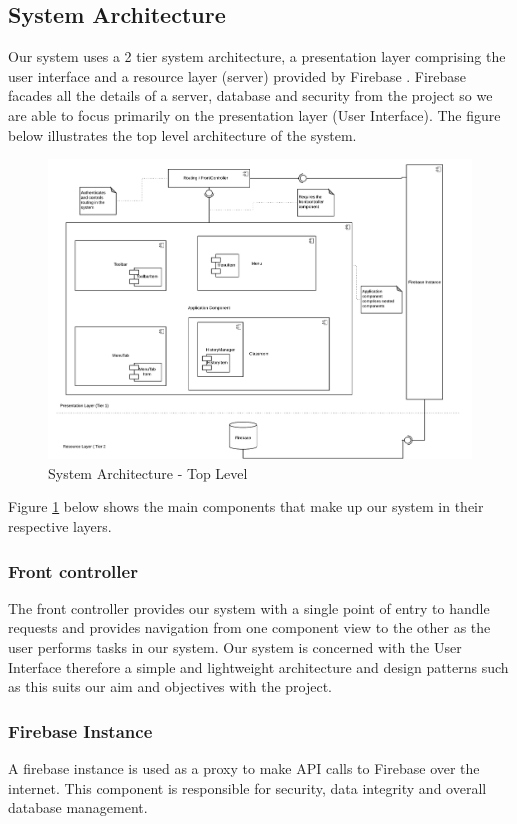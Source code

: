 \subsection{System Architecture}
Our system uses a 2 tier system architecture, a presentation layer comprising the user interface and a resource layer (server) provided by Firebase \cite{website:Firebase}. Firebase facades all the details of a server, database and security from the project so we are able to focus primarily on the presentation layer (User Interface). The figure below illustrates the top level architecture of the system.
\begin{figure}[!ht]
\caption{System Architecture - Top Level}
    \label{fig:SystemArchitecture}
    \centering
    \includegraphics[scale=0.5]{figures/SystemArch}
\end{figure}
Figure \ref{fig:SystemArchitecture} below shows the main components that make up our system in their respective layers.
\subsubsection{Front controller}
The front controller provides our system with a single point of entry to handle requests and provides navigation from one component view to the other as the user performs tasks in our system. Our system is concerned with the User Interface therefore a simple and lightweight architecture and design patterns such as this suits our aim and objectives with the project.

\subsubsection{Firebase Instance}
A firebase instance is used as a proxy to make API calls to Firebase over the internet. This component is responsible for security, data integrity and overall database management.

